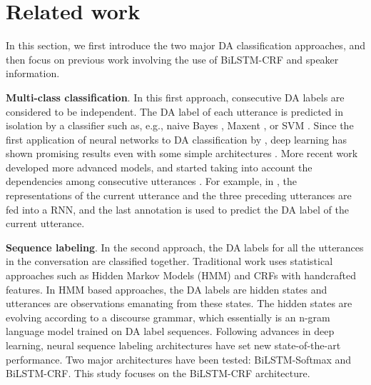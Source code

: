 \documentclass[11pt,a4paper]{article}
\begin{document}
\section{Related work}
In this section, we first introduce the two major DA classification approaches, and then focus on previous work involving the use of BiLSTM-CRF and speaker information.

\noindent\textbf{Multi-class classification}.
In this first approach, consecutive DA labels are considered to be independent.
The DA label of each utterance is predicted in isolation by a classifier such as, e.g., naive Bayes \citep{grau2004dialogue}, Maxent \citep{venkataraman2005does,ang2005automatic}, or SVM \citep{liu2006using}.
Since the first application of neural networks to DA classification by \citet{ries1999hmm}, deep learning has shown promising results even with some simple architectures \citep{khanpour-etal-2016-dialogue,shen2016neural}.
More recent work developed more advanced models, and started taking into account the dependencies among consecutive utterances \citep{kalchbrenner2013recurrent,lee2016sequential,ortega-vu-2017-neural, bothe-etal-2018-context}.
For example, in \citep{bothe-etal-2018-context}, the representations of the current utterance and the three preceding utterances are fed into a RNN, and the last annotation is used to predict the DA label of the current utterance.

\noindent\textbf{Sequence labeling}. In the second approach, the DA labels for all the utterances in the conversation are classified together.
Traditional work uses statistical approaches such as Hidden Markov Models (HMM) \cite{stolcke-etal-2000-dialogue,surendran2006dialog,tavafi-etal-2013-dialogue} and CRFs \citep{lendvai2007token,zimmermann2009joint,kim-etal-2010-classifying} with handcrafted features.
In HMM based approaches, the DA labels are hidden states and utterances are observations emanating from these states. The hidden states are evolving according to a discourse grammar, which essentially is an n-gram language model trained on DA label sequences.
Following advances in deep learning, neural sequence labeling architectures \citep{huang2015bidirectional,reimers2017optimal,yang2018design,cui2019hierarchically} have set new state-of-the-art performance.
Two major architectures have been tested: BiLSTM-Softmax \citep{li-wu-2016-multi,tran-etal-2017-hierarchical,liu-etal-2017-using-context} and BiLSTM-CRF.
This study focuses on the BiLSTM-CRF architecture.
\end{document}

